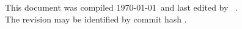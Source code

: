 
\newcommand{\commitlink}{https://github.com/CaterHatterPillar/dv2524/commit/}
\expandafter\def\expandafter\commitlink\expandafter{\commitlink \gitAbbrevHash}

\yyyymmdddate
\renewcommand{\dateseparator}{-} %

\begin{frame}[t]

{\tiny This document was compiled \today\ and last edited by \gitAuthorName\ \gitAuthorDate .\\
The revision may be identified by commit hash \href{\commitlink}{\texttt{\gitAbbrevHash}}}.

\end{frame}